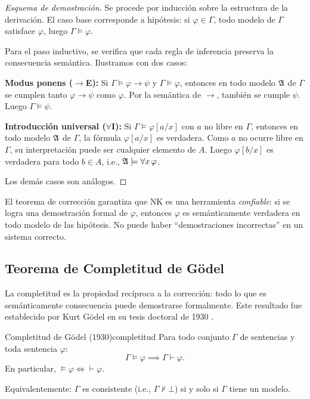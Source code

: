 \begin{proof}[Esquema de demostración]
Se procede por inducción sobre la estructura de la derivación. El caso base corresponde a hipótesis: si $\varphi \in \Gamma$, todo modelo de $\Gamma$ satisface $\varphi$, luego $\Gamma \models \varphi$.

Para el paso inductivo, se verifica que cada regla de inferencia preserva la consecuencia semántica. Ilustramos con dos casos:

\textbf{Modus ponens ($\to$E):} Si $\Gamma \models \varphi \to \psi$ y $\Gamma \models \varphi$, entonces en todo modelo $\mathfrak{A}$ de $\Gamma$ se cumplen tanto $\varphi \to \psi$ como $\varphi$. Por la semántica de $\to$, también se cumple $\psi$. Luego $\Gamma \models \psi$.

\textbf{Introducción universal ($\forall$I):} Si $\Gamma \models \varphi[a/x]$ con $a$ no libre en $\Gamma$, entonces en todo modelo $\mathfrak{A}$ de $\Gamma$, la fórmula $\varphi[a/x]$ es verdadera. Como $a$ no ocurre libre en $\Gamma$, su interpretación puede ser cualquier elemento de $A$. Luego $\varphi[b/x]$ es verdadera para todo $b \in A$, i.e., $\mathfrak{A} \models \forall x\, \varphi$.

Los demás casos son análogos.
\end{proof}

\begin{importante}
El teorema de corrección garantiza que NK es una herramienta \emph{confiable}: si se logra una demostración formal de $\varphi$, entonces $\varphi$ es semánticamente verdadera en todo modelo de las hipótesis. No puede haber ``demostraciones incorrectas'' en un sistema correcto.
\end{importante}

\subsection{Teorema de Completitud de Gödel}

La completitud es la propiedad recíproca a la corrección: todo lo que es semánticamente consecuencia puede demostrarse formalmente. Este resultado fue establecido por Kurt Gödel en su tesis doctoral de 1930 \cite{godel1930, enderton2001}.

\begin{teorema}{Completitud de Gödel (1930)}{completitud}
Para todo conjunto $\Gamma$ de sentencias y toda sentencia $\varphi$:
\[
  \Gamma \models \varphi \implies \Gamma \vdash \varphi.
\]
En particular, $\models \varphi \iff \vdash \varphi$.

Equivalentemente: $\Gamma$ es consistente (i.e., $\Gamma \not\vdash \bot$) si y solo si $\Gamma$ tiene un modelo.
\end{teorema}

